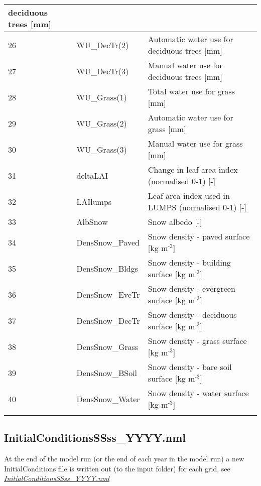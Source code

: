 \documentclass[letterpaper,10pt,english]{sphinxmanual}
\begin{document}
\begin{savenotes}
\begin{longtable}{|l|l|l|}
deciduous trees {[}mm{]}
\\
\hline
26
&
WU\_DecTr(2)
&
Automatic water use
for deciduous trees
{[}mm{]}
\\
\hline
27
&
WU\_DecTr(3)
&
Manual water use for
deciduous trees {[}mm{]}
\\
\hline
28
&
WU\_Grass(1)
&
Total water use for
grass {[}mm{]}
\\
\hline
29
&
WU\_Grass(2)
&
Automatic water use
for grass {[}mm{]}
\\
\hline
30
&
WU\_Grass(3)
&
Manual water use for
grass {[}mm{]}
\\
\hline
31
&
deltaLAI
&
Change in leaf area
index (normalised
0-1) {[}-{]}
\\
\hline
32
&
LAIlumps
&
Leaf area index used
in LUMPS (normalised
0-1) {[}-{]}
\\
\hline
33
&
AlbSnow
&
Snow albedo {[}-{]}
\\
\hline
34
&
DensSnow\_Paved
&
Snow density - paved
surface {[}kg
m$^{\text{-3}}${]}
\\
\hline
35
&
DensSnow\_Bldgs
&
Snow density -
building surface {[}kg
m$^{\text{-3}}${]}
\\
\hline
36
&
DensSnow\_EveTr
&
Snow density -
evergreen surface {[}kg
m$^{\text{-3}}${]}
\\
\hline
37
&
DensSnow\_DecTr
&
Snow density -
deciduous surface {[}kg
m$^{\text{-3}}${]}
\\
\hline
38
&
DensSnow\_Grass
&
Snow density - grass
surface {[}kg
m$^{\text{-3}}${]}
\\
\hline
39
&
DensSnow\_BSoil
&
Snow density - bare
soil surface {[}kg
m$^{\text{-3}}${]}
\\
\hline
40
&
DensSnow\_Water
&
Snow density - water
surface {[}kg
m$^{\text{-3}}${]}
\\
\hline&&\\
\hline
\end{longtable}\sphinxatlongtableend\end{savenotes}


\subsection{InitialConditionsSSss\_YYYY.nml}
\label{\detokenize{output-files:initialconditionsssss-yyyy-nml}}\label{\detokenize{output-files:initialconditionsssss-yyyy-nml-1}}
At the end of the model run (or the end of each year in the model run) a
new InitialConditions file is written out (to the input folder) for each
grid, see
{\hyperref[\detokenize{output-files:InitialConditionsSSss_YYYY.nml}]{\emph{InitialConditionsSSss\_YYYY.nml}}}
\end{document}
